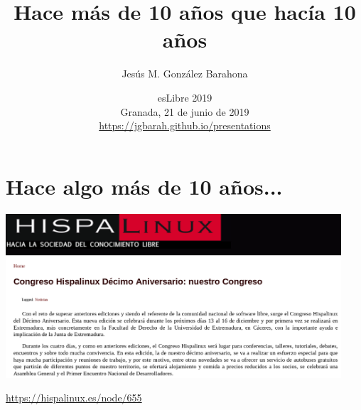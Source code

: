 \documentclass[17pt,aspectratio=169]{beamer}
\begin{document}
\title{Hace más de 10 años que hacía 10 años}
\author{Jesús M. González Barahona}

\date{esLibre 2019 \\
  Granada, 21 de junio de 2019\\
{\small \url{https://jgbarah.github.io/presentations}} \\}

\frame{
\maketitle
}




\section{Hace algo más de 10 años...}

\begin{frame}

\begin{center}
  \includegraphics[width=12.5cm]{figs/hispalinux-x}
\end{center}  

\begin{flushright}
  {\small{\url{https://hispalinux.es/node/655}}}
\end{flushright}
\end{frame}
\end{document}
